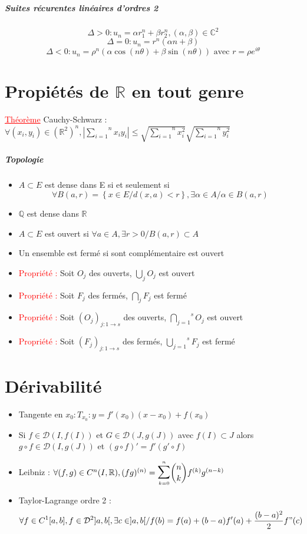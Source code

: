 \documentclass[a4paper, french]{article}
\newcommand{\R}{\mathbb{R}}
\newcommand{\C}{\mathbb{C}}
\newcommand{\D}{\mathcal{D}}
\newcommand{\al}{\alpha}
\newcommand{\be}{\beta}
\newcommand{\De}{\Delta}
\newcommand{\som}[2]{\overset{#2}{\underset{#1}{\sum}}}
\newcommand{\thm}{\textcolor{red}{\underline{Théorème} }}
\newcommand{\ppt}{\textcolor{red}{Propriété : }}
\newcommand{\acc}[1]{\left\{ #1 \right\}}
\newcommand{\ssum}[2]{\vcenter{\hbox{\scaleto[4ex]{\displaystyle\sum_{\scriptscriptstyle #1}^{\scriptscriptstyle #2}}{7ex}}}}
\begin{document}
	\subparagraph{Suites récurentes linéaires d'ordres 2}  
	\[ \De>0 : u_n=\al r_1^n+\be r_2^n,(\al,\be) \in \C^2 \]
	\[ \De=0 : u_n=r^n(\al n+\be) \]
	\[ \De<0 : u_n=\rho^n(\al \cos(n\theta) + \be \sin(n\theta)) \text{ avec } r=\rho e^{i\theta}\]

	\section{Propiétés de \(\R\) en tout genre}
	 \thm Cauchy-Schwarz : $\forall (x_i,y_i) \in (\R^2)^n, \left\lvert \som{i=1}{n}x_iy_i \right\rvert \leqslant \sqrt{\som{i=1}{n}x_i^2}\sqrt{\som{i=1}{n}y_i^2}$
	\subparagraph{Topologie}
	\begin{itemize}[label=\(\bullet\)]
	  \item $A\subset E$ est dense dans E si et seulement si $$\forall B(a,r)=\acc{x\in E / d(x,a)<r}, \exists \al \in A / \al \in B(a,r)$$
	  \item $\mathbb{Q}$ est dense dans $\R$
	  \item $A \subset E$ est ouvert si $\forall a \in A, \exists r>0 / B(a,r) \subset A$
	  \item Un ensemble est fermé si sont complémentaire est ouvert
	  \item \ppt Soit $O_j$ des ouverts, $\underset{j}\bigcup O_j$ est ouvert
	  \item \ppt Soit $F_j$ des fermés, $\underset{j}\bigcap F_j$ est fermé
	  \item \ppt Soit $(O_j)_{j : 1\rightarrow s}$ des ouverts, $\overset{s}{\underset{j=1}{\bigcap}} O_j$ est ouvert
	  \item \ppt Soit $(F_j)_{j : 1\rightarrow s}$ des fermés, $\overset{s}{\underset{j=1}{\bigcup}} F_j$ est fermé
	\end{itemize}

	\section{Dérivabilité}
	\begin{itemize}[label=\(\bullet\)]
	  \item Tangente en $x_0 : T_{x_0} : y=f'(x_0)(x-x_0)+f(x_0)$
	  \item Si $f \in \D(I,f(I))$ et $ G \in \D(J,g(J))$ avec $f(I) \subset J$ alors $g\circ f \in \D(I,g(J))$ et $(g\circ f)'=f'(g'\circ f)$
	  \item Leibniz : $\forall (f,g) \in C^n(I,\R), (fg)^{(n)}=\ssum{k=0}{n} \dbinom{n}{k} f^{(k)}g^{(n-k)}$
	  \item Taylor-Lagrange ordre 2 : $$\forall f \in C^1[a,b], f \in \D^2]a,b[, \exists c \in ]a,b[ / f(b)=f(a)+(b-a)f'(a)+\frac{(b-a)^2}{2}f"(c)$$
	\end{itemize}
\end{document}
